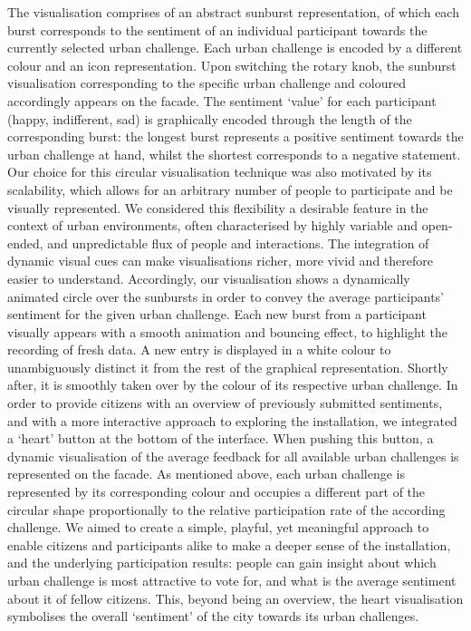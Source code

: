 The visualisation comprises of an abstract sunburst representation, of which each burst corresponds to the sentiment of an individual participant towards the currently selected urban challenge. 
Each urban challenge is encoded by a different colour and an icon representation. 
Upon switching the rotary knob, the sunburst visualisation corresponding to the specific urban challenge and coloured accordingly appears on the facade. 
The sentiment ‘value’ for each participant (happy, indifferent, sad) is graphically encoded through the length of the corresponding burst: the longest burst represents a positive sentiment towards the urban challenge at hand, whilst the shortest corresponds to a negative statement. 
Our choice for this circular visualisation technique was also motivated by its scalability, which allows for an arbitrary number of people to participate and be visually represented.
We considered this flexibility a desirable feature in the context of urban environments, often characterised by highly variable and open-ended, and unpredictable flux of people and interactions. 
The integration of dynamic visual cues can make visualisations richer, more vivid and therefore easier to understand. 
Accordingly, our visualisation shows a dynamically animated circle over the sunbursts in order to convey the average participants’ sentiment for the given urban challenge. 
Each new burst from a participant visually appears with a smooth animation and bouncing effect, to highlight the recording of fresh data. 
A new entry is displayed in a white colour to unambiguously distinct it from the rest of the graphical representation.
Shortly after, it is smoothly taken over by the colour of its respective urban challenge. 
In order to provide citizens with an overview of previously submitted sentiments, and with a more interactive approach to exploring the installation, we integrated a ‘heart’ button at the bottom of the interface. 
When pushing this button, a dynamic visualisation of the average feedback for all available urban challenges is represented on the facade. 
As mentioned above, each urban challenge is represented by its corresponding colour and occupies a different part of the circular shape proportionally to the relative participation rate of the according challenge.
We aimed to create a simple, playful, yet meaningful approach to enable citizens and participants alike to make a deeper sense of the installation, and the underlying participation results: people can gain insight about which urban challenge is most attractive to vote for, and what is the average sentiment about it of fellow citizens. 
This, beyond being an overview, the heart visualisation symbolises the overall ‘sentiment’ of the city towards its urban challenges.

